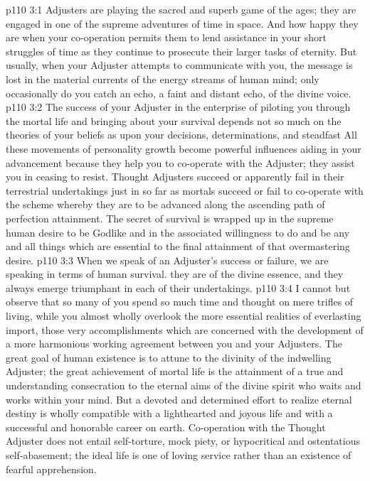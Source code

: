 \vs p110 3:1 Adjusters are playing the sacred and superb game of the ages; they are engaged in one of the supreme adventures of time in space. And how happy they are when your co\hyp{}operation permits them to lend assistance in your short struggles of time as they continue to prosecute their larger tasks of eternity. But usually, when your Adjuster attempts to communicate with you, the message is lost in the material currents of the energy streams of human mind; only occasionally do you catch an echo, a faint and distant echo, of the divine voice.
\vs p110 3:2 The success of your Adjuster in the enterprise of piloting you through the mortal life and bringing about your survival depends not so much on the theories of your beliefs as upon your decisions, determinations, and steadfast  All these movements of personality growth become powerful influences aiding in your advancement because they help you to co\hyp{}operate with the Adjuster; they assist you in ceasing to resist. Thought Adjusters succeed or apparently fail in their terrestrial undertakings just in so far as mortals succeed or fail to co\hyp{}operate with the scheme whereby they are to be advanced along the ascending path of perfection attainment. The secret of survival is wrapped up in the supreme human desire to be Godlike and in the associated willingness to do and be any and all things which are essential to the final attainment of that overmastering desire.
\vs p110 3:3 When we speak of an Adjuster’s success or failure, we are speaking in terms of human survival.  they are of the divine essence, and they always emerge triumphant in each of their undertakings.
\pc \vs p110 3:4 I cannot but observe that so many of you spend so much time and thought on mere trifles of living, while you almost wholly overlook the more essential realities of everlasting import, those very accomplishments which are concerned with the development of a more harmonious working agreement between you and your Adjusters. The great goal of human existence is to attune to the divinity of the indwelling Adjuster; the great achievement of mortal life is the attainment of a true and understanding consecration to the eternal aims of the divine spirit who waits and works within your mind. But a devoted and determined effort to realize eternal destiny is wholly compatible with a lighthearted and joyous life and with a successful and honorable career on earth. Co\hyp{}operation with the Thought Adjuster does not entail self\hyp{}torture, mock piety, or hypocritical and ostentatious self\hyp{}abasement; the ideal life is one of loving service rather than an existence of fearful apprehension.
